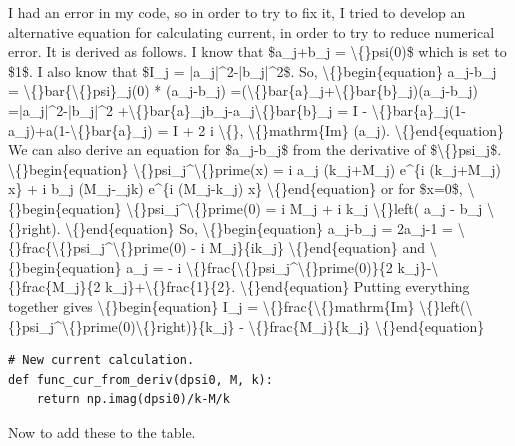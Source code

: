 \documentclass{article}
\begin{document}
I had an error in my code, so in order to try to fix it, I tried to develop an alternative equation for calculating current, in order to try to reduce numerical error. It is derived as follows. I know that \$a\_j+b\_j = \textbackslash\{\}psi(0)\$ which is set to \$1\$. I also know that \$I\_j = |a\_j|\textasciicircum{}2-|b\_j|\textasciicircum{}2\$. So,
\textbackslash\{\}begin\{equation\}
a\_j-b\_j = \textbackslash\{\}bar\{\textbackslash\{\}psi\}\_j(0) * (a\_j-b\_j) =(\textbackslash\{\}bar\{a\}\_j+\textbackslash\{\}bar\{b\}\_j)(a\_j-b\_j) =|a\_j|\textasciicircum{}2-|b\_j|\textasciicircum{}2 +\textbackslash\{\}bar\{a\}\_jb\_j-a\_j\textbackslash\{\}bar\{b\}\_j = I - \textbackslash\{\}bar\{a\}\_j(1-a\_j)+a(1-\textbackslash\{\}bar\{a\}\_j) = I + 2 i \textbackslash\{\}, \textbackslash\{\}mathrm\{Im\} (a\_j).
\textbackslash\{\}end\{equation\}
We can also derive an equation for \$a\_j-b\_j\$ from the derivative of \$\textbackslash\{\}psi\_j\$. 
\textbackslash\{\}begin\{equation\}
\textbackslash\{\}psi\_j\textasciicircum{}\textbackslash\{\}prime(x) = i a\_j (k\_j+M\_j) e\textasciicircum{}\{i (k\_j+M\_j) x\} + i b\_j (M\_j-\_jk) e\textasciicircum{}\{i (M\_j-k\_j) x\} 
\textbackslash\{\}end\{equation\}
or for \$x=0\$,
\textbackslash\{\}begin\{equation\}
\textbackslash\{\}psi\_j\textasciicircum{}\textbackslash\{\}prime(0) = i M\_j + i k\_j \textbackslash\{\}left( a\_j - b\_j \textbackslash\{\}right).
\textbackslash\{\}end\{equation\} 
So,
\textbackslash\{\}begin\{equation\}
a\_j-b\_j = 2a\_j-1 = \textbackslash\{\}frac\{\textbackslash\{\}psi\_j\textasciicircum{}\textbackslash\{\}prime(0) - i M\_j\}\{ik\_j\}
\textbackslash\{\}end\{equation\}
and
\textbackslash\{\}begin\{equation\}
a\_j = - i \textbackslash\{\}frac\{\textbackslash\{\}psi\_j\textasciicircum{}\textbackslash\{\}prime(0)\}\{2 k\_j\}-\textbackslash\{\}frac\{M\_j\}\{2 k\_j\}+\textbackslash\{\}frac\{1\}\{2\}.
\textbackslash\{\}end\{equation\}
Putting everything together gives
\textbackslash\{\}begin\{equation\}
I\_j = \textbackslash\{\}frac\{\textbackslash\{\}mathrm\{Im\} \textbackslash\{\}left(\textbackslash\{\}psi\_j\textasciicircum{}\textbackslash\{\}prime(0)\textbackslash\{\}right)\}\{k\_j\} - \textbackslash\{\}frac\{M\_j\}\{k\_j\}
\textbackslash\{\}end\{equation\}

\begin{lstlisting}
# New current calculation.
def func_cur_from_deriv(dpsi0, M, k):
    return np.imag(dpsi0)/k-M/k\end{lstlisting}

Now to add these to the table.
\end{document}
